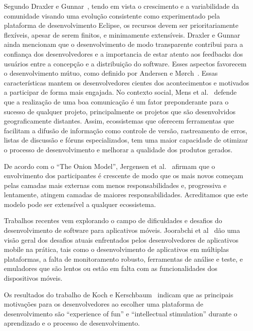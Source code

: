\documentclass[conference]{IEEEtran}
\begin{document}
Segundo Draxler e Gunnar~\cite{Draxler2011}, tendo em vista o crescimento e a variabilidade da comunidade visando uma evolução consistente como experimentado pela plataforma de desenvolvimento Eclipse, os recursos devem ser prioritariamente flexíveis, apesar de serem finitos, e minimamente extensíveis. Draxler e Gunnar~\cite{Draxler2011} ainda mencionam que o desenvolvimento de modo transparente contribui para a confiança dos desenvolvedores e a importancia de estar atento aos feedbacks dos usuários entre a concepção e a distribuição do software. Esses aspectos favorecem o desenvolvimento mútuo, como definido por Andersen e Mørch~\cite{Andersen2009}. Essas características  mantem os desenvolvedores cientes dos acontecimentos e motivados a participar de forma mais engajada. No contexto social, Mens et al.~\cite{Mens2014} defende que a realização de uma boa comunicação é um fator preponderante para o sucesso de qualquer projeto, principalmente os projetos que são desenvolvidos geograficamente distantes. Assim, ecossistemas que oferecem ferramentas que facilitam a difusão de informação como controle de versão, rastreamento de erros, listas de discussão e fóruns especializados,  tem uma maior capacidade de otimizar o processo de desenvolvimento e melhorar a qualidade dos produtos gerados.

De acordo com o “The Onion Model”, Jergensen et al.~\cite{Jergensen2011} afirmam que o envolvimento dos participantes é crescente de modo que os mais novos começam pelas camadas mais externas com menos responsabilidades e, progressiva e lentamente, atingem camadas de maiores responsabilidades. Acreditamos que este modelo pode ser extensível a qualquer ecossistema.

Trabalhos recentes vem explorando o campo de dificuldades e desafios do desenvolvimento de software para aplicativos móveis. Joorabchi et al~\cite{Joorabchi2013} dão uma visão geral dos desafios atuais enfrentados pelos desenvolvedores de aplicativos mobile na prática, tais como o desenvolvimento de aplicativos em múltiplas plataformas, a falta de monitoramento robusto, ferramentas de análise e teste, e emuladores que são lentos ou estão em falta com as funcionalidades dos dispositivos móveis.

Os resultados do trabalho de Koch e Kerschbaum~\cite{Koch2014} indicam que as principais motivações para os desenvolvedores ao escolher uma plataforma de desenvolvimento são “experience of fun” e “intellectual stimulation” durante o aprendizado e o processo de desenvolvimento. 



%
%
%



\end{document}

